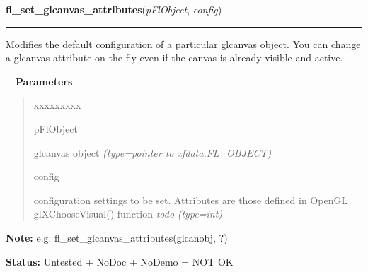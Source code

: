 \hspace{.8\funcindent}\begin{boxedminipage}{\funcwidth}

    \raggedright \textbf{fl\_set\_glcanvas\_attributes}(\textit{pFlObject}, \textit{config})

    \vspace{-1.5ex}

    \rule{\textwidth}{0.5\fboxrule}
\setlength{\parskip}{2ex}

Modifies the default configuration of a particular glcanvas
object. You can change a glcanvas attribute on the fly even if
the canvas is already visible and active.

-{}-
\setlength{\parskip}{1ex}
      \textbf{Parameters}
      \vspace{-1ex}

      \begin{quote}
        \begin{Ventry}{xxxxxxxxx}

          \item[pFlObject]


glcanvas object
            {\it (type=pointer to xfdata.FL\_OBJECT)}

          \item[config]


configuration settings to be set. Attributes are those defined in
OpenGL glXChooseVisual() function \emph{todo}
            {\it (type=int)}

        \end{Ventry}

      \end{quote}

\textbf{Note:} 
e.g. fl\_set\_glcanvas\_attributes(glcanobj, ?)


\textbf{Status:} 
Untested + NoDoc + NoDemo = NOT OK


    \end{boxedminipage}

    \label{xformslib:flglcanvas:fl_get_glcanvas_attributes}

    \vspace{0.5ex}

